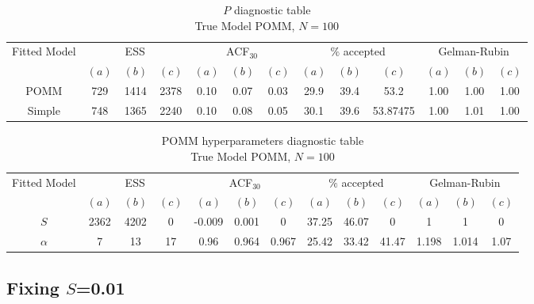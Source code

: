 \documentclass[11pt]{amsart}
\begin{document}
\begin{table}[htbp]
\centering
\caption*{
{\large $P$ diagnostic table} \\ 
{\small True Model POMM, $N=100$}
} 
\begin{tabular}{ccccccccccccc}
\toprule
\multirow{2}{*}{Fitted Model} & \multicolumn{3}{c}{ESS} & \multicolumn{3}{c}{
ACF$_{30}$} & \multicolumn{3}{c}{$\%$ accepted} & \multicolumn{3}{c}{Gelman-Rubin}\\
\cmidrule(lr){2-4} \cmidrule(lr){5-7} \cmidrule(lr){8-10} \cmidrule(lr){11-13} 
& $(a)$ & $(b)$ & $(c)$ & $(a)$ & $(b)$ & $(c)$ & $(a)$ & $(b)$ & $(c)$ & $(a)$ & $(b)$ & $(c)$ \\
\midrule
POMM &729 & 1414 & 2378& 0.10& 0.07 & 0.03 & 29.9 & 39.4 & 53.2 & 1.00 & 1.00& 1.00   \\
Simple &748& 1365 & 2240 & 0.10 & 0.08 & 0.05 & 30.1 & 39.6 & 53.87475 & 1.00 & 1.01 & 1.00 \\
\bottomrule
\end{tabular}
\label{table:simulations_from_simple}
\end{table}


\begin{table}[htbp]
\centering
\caption*{
{\large POMM hyperparameters diagnostic table} \\ 
{\small True Model POMM, $N=100$}
} 
\begin{tabular}{ccccccccccccc}
\toprule
\multirow{2}{*}{Fitted Model} & \multicolumn{3}{c}{ESS} & \multicolumn{3}{c}{
ACF$_{30}$} & \multicolumn{3}{c}{$\%$ accepted} & \multicolumn{3}{c}{Gelman-Rubin}\\
\cmidrule(lr){2-4} \cmidrule(lr){5-7} \cmidrule(lr){8-10} \cmidrule(lr){11-13} 
& $(a)$ & $(b)$ & $(c)$ & $(a)$ & $(b)$ & $(c)$ & $(a)$ & $(b)$ & $(c)$ & $(a)$ & $(b)$ & $(c)$ \\
\midrule
$S$ &2362 & 4202 & 0 & -0.009 & 0.001 & 0 & 37.25 & 46.07 & 0 & 1 & 1 &0 \\
$\alpha$ &7 & 13 & 17 & 0.96 & 0.964 & 0.967 & 25.42 & 33.42 & 41.47 & 1.198 & 1.014 & 1.07   \\
\bottomrule
\end{tabular}
\label{table:simulations_from_simple}
\end{table}

\clearpage

\subsection{Fixing $S$=0.01}
\end{document}
